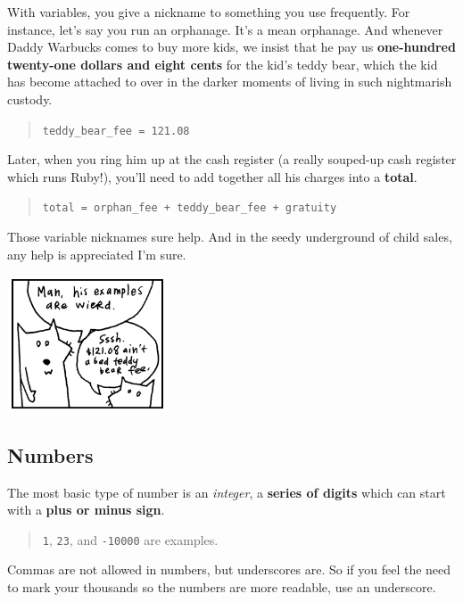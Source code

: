 \documentclass[10pt,twoside]{report}
\begin{document}
With variables, you give a nickname to something you use frequently.
For instance, let's say you run an orphanage.  It's a mean orphanage.
And whenever Daddy Warbucks comes to buy more kids, we insist that he
pay us {\bf one-hundred twenty-one dollars and eight cents} for the
kid's teddy bear, which the kid has become attached to over in the
darker moments of living in such nightmarish custody.

\begin{quote}
\lstinline[breaklines=true]|teddy_bear_fee = 121.08|\end{quote}


Later, when you ring him up at the cash register (a really souped-up
cash register which runs Ruby!), you'll need to add together all his
charges into a {\bf total}.

\begin{quote}
\lstinline[breaklines=true]|total = orphan_fee + teddy_bear_fee + gratuity|\end{quote}


Those variable nicknames sure help.  And in the seedy underground of
child sales, any help is appreciated I'm sure.

	\includegraphics[width=0.3575\textwidth]{cache/8.png}




\subsection{Numbers}



The most basic type of number is an {\em integer}, a {\bf series of
  digits} which can start with a {\bf plus or minus sign}.

\begin{quote}
\lstinline[breaklines=true]|1|, \lstinline[breaklines=true]|23|, and
\lstinline[breaklines=true]|-10000| are examples.\end{quote}


Commas are not allowed in numbers, but underscores are.  So if you
feel the need to mark your thousands so the numbers are more readable,
use an underscore.
\end{document}
